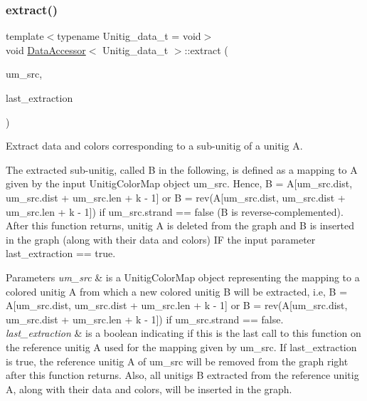 \subsubsection{\texorpdfstring{extract()}{extract()}}
{\footnotesize\ttfamily template$<$typename Unitig\+\_\+data\+\_\+t  = void$>$ \\
void \hyperlink{classDataAccessor}{Data\+Accessor}$<$ Unitig\+\_\+data\+\_\+t $>$\+::extract (\begin{DoxyParamCaption}\item[{const \hyperlink{classUnitigMap}{Unitig\+Color\+Map}$<$ U $>$ \&}]{um\+\_\+src,  }\item[{const bool}]{last\+\_\+extraction }\end{DoxyParamCaption})}



Extract data and colors corresponding to a sub-\/unitig of a unitig A. 

The extracted sub-\/unitig, called B in the following, is defined as a mapping to A given by the input Unitig\+Color\+Map object um\+\_\+src. Hence, B = A\mbox{[}um\+\_\+src.\+dist, um\+\_\+src.\+dist + um\+\_\+src.\+len + k -\/ 1\mbox{]} or B = rev(A\mbox{[}um\+\_\+src.\+dist, um\+\_\+src.\+dist + um\+\_\+src.\+len + k -\/ 1\mbox{]}) if um\+\_\+src.\+strand == false (B is reverse-\/complemented). After this function returns, unitig A is deleted from the graph and B is inserted in the graph (along with their data and colors) IF the input parameter last\+\_\+extraction == true. 
\begin{DoxyParams}{Parameters}
{\em um\+\_\+src} & is a Unitig\+Color\+Map object representing the mapping to a colored unitig A from which a new colored unitig B will be extracted, i.\+e, B = A\mbox{[}um\+\_\+src.\+dist, um\+\_\+src.\+dist + um\+\_\+src.\+len + k -\/ 1\mbox{]} or B = rev(A\mbox{[}um\+\_\+src.\+dist, um\+\_\+src.\+dist + um\+\_\+src.\+len + k -\/ 1\mbox{]}) if um\+\_\+src.\+strand == false. \\
\hline
{\em last\+\_\+extraction} & is a boolean indicating if this is the last call to this function on the reference unitig A used for the mapping given by um\+\_\+src. If last\+\_\+extraction is true, the reference unitig A of um\+\_\+src will be removed from the graph right after this function returns. Also, all unitigs B extracted from the reference unitig A, along with their data and colors, will be inserted in the graph. \\
\hline
\end{DoxyParams}
\mbox{\label{classDataAccessor_af72510548faff435e7241d4dacd63549}} 
